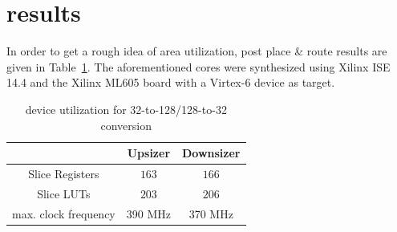 \documentclass[10pt, conference, compsocconf]{IEEEtran}
\begin{document}
\section{results}

In order to get a rough idea of area utilization, post place \& route results are given in Table~\ref{result_table}. The aforementioned cores were synthesized using Xilinx ISE 14.4 and the Xilinx ML605 board with a Virtex-6 device as target. 

\begin{table}[!t]
	\caption{device utilization for 32-to-128/128-to-32 conversion}
    \label{result_table}
    \centering
    \begin{tabular}{| c | c | c|}
    \hline
 & Upsizer & Downsizer \\ \hline \hline
 Slice Registers & $163$  & $166$  \\ \hline
 Slice LUTs & $203$  & $206$  \\ \hline
 max. clock frequency & 390 MHz & 370 MHz \\ \hline
    \end{tabular}
\end{table}





%
%

\end{document}
